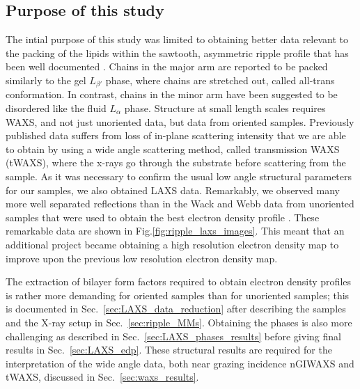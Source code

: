 \subsection{Purpose of this study}
The intial purpose of this study was limited to obtaining better data relevant
to the packing of the lipids within the sawtooth, asymmetric ripple profile 
that has been well documented \cite{ref:Sun96}.
Chains in the major arm are reported to be packed similarly to the gel $L_{\beta'}$ phase,
where chains are stretched out, called all-trans conformation. 
In contrast, chains in the minor arm have been suggested to be disordered
like the fluid $L_\alpha$ phase. 
Structure at small length scales requires WAXS, and not just unoriented data, 
but data from oriented samples.  Previously published data suffers from loss 
of in-plane scattering intensity that we are able to obtain by using a wide 
angle scattering method, called  transmission WAXS (tWAXS), where the x-rays 
go through the substrate before scattering from the sample.  As it was 
necessary to confirm the usual low angle structural parameters for our 
samples, we also obtained LAXS data.  Remarkably, we observed many more well 
separated reflections than in the Wack and Webb data  from unoriented samples 
that were used to obtain the best electron density profile \cite{ref:Sun96}.  
These remarkable data are shown in Fig.\ref{fig:ripple_laxs_images}.  
This meant that an additional project became obtaining a high resolution electron density map 
to improve upon the previous low resolution electron density map.

The extraction of bilayer form factors required to obtain electron density 
profiles is rather more demanding for oriented samples than for unoriented 
samples; this is documented in Sec.~\ref{sec:LAXS_data_reduction} after describing the samples 
and the X-ray setup in Sec.~\ref{sec:ripple_MMs}.  
Obtaining the phases is also more 
challenging as described in Sec.~\ref{sec:LAXS_phases_results} before giving final results in 
Sec.~\ref{sec:LAXS_edp}.  
These structural results are required for the interpretation 
of the wide angle data, both near grazing incidence nGIWAXS and 
tWAXS, discussed in Sec.~\ref{sec:waxs_results}.  

